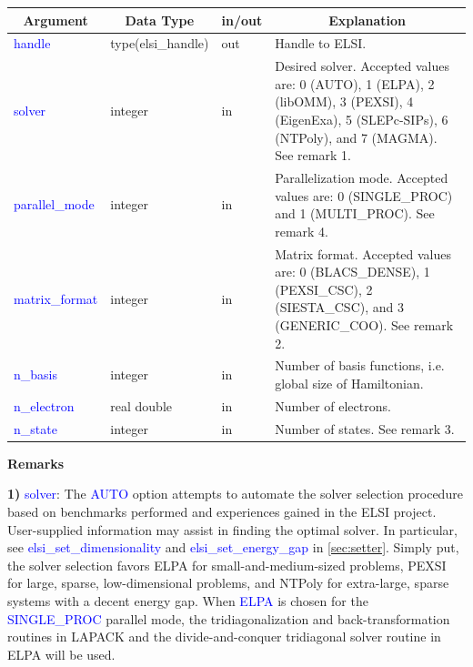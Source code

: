 \documentclass{report}
\begin{document}
\begin{tabular}[]{|p{30mm}|p{30mm}|p{15mm}|p{90mm}|}
\hline
\multicolumn{1}{|c|}{\textbf{Argument}} & \multicolumn{1}{c|}{\textbf{Data Type}} & \multicolumn{1}{c|}{\textbf{in/out}} & \multicolumn{1}{c|}{\textbf{Explanation}}\\
\hline
\textcolor{blue}{handle}         & type(elsi\_handle) & out & Handle to ELSI.\\
\hline
\textcolor{blue}{solver}         & integer            & in  & Desired solver. Accepted values are: 0 (AUTO), 1 (ELPA), 2 (libOMM), 3 (PEXSI), 4 (EigenExa), 5 (SLEPc-SIPs), 6 (NTPoly), and 7 (MAGMA). See remark 1.\\
\hline
\textcolor{blue}{parallel\_mode} & integer            & in  & Parallelization mode. Accepted values are: 0 (SINGLE\_PROC) and 1 (MULTI\_PROC). See remark 4.\\
\hline
\textcolor{blue}{matrix\_format} & integer            & in  & Matrix format. Accepted values are: 0 (BLACS\_DENSE), 1 (PEXSI\_CSC), 2 (SIESTA\_CSC), and 3 (GENERIC\_COO). See remark 2.\\
\hline
\textcolor{blue}{n\_basis}       & integer            & in  & Number of basis functions, i.e. global size of Hamiltonian.\\
\hline
\textcolor{blue}{n\_electron}    & real double        & in  & Number of electrons.\\
\hline
\textcolor{blue}{n\_state}       & integer            & in  & Number of states. See remark 3.\\
\hline
\end{tabular}

\textbf{Remarks}

\textbf{1)} \textcolor{blue}{solver}: The \textcolor{blue}{AUTO} option attempts to automate the solver selection procedure based on benchmarks performed and experiences gained in the ELSI project. User-supplied information may assist in finding the optimal solver. In particular, see \textcolor{blue}{elsi\_set\_dimensionality} and \textcolor{blue}{elsi\_set\_energy\_gap} in \ref{sec:setter}. Simply put, the solver selection favors ELPA for small-and-medium-sized problems, PEXSI for large, sparse, low-dimensional problems, and NTPoly for extra-large, sparse systems with a decent energy gap. When \textcolor{blue}{ELPA} is chosen for the \textcolor{blue}{SINGLE\_PROC} parallel mode, the tridiagonalization and back-transformation routines in LAPACK and the divide-and-conquer tridiagonal solver routine in ELPA will be used.
\end{document}
